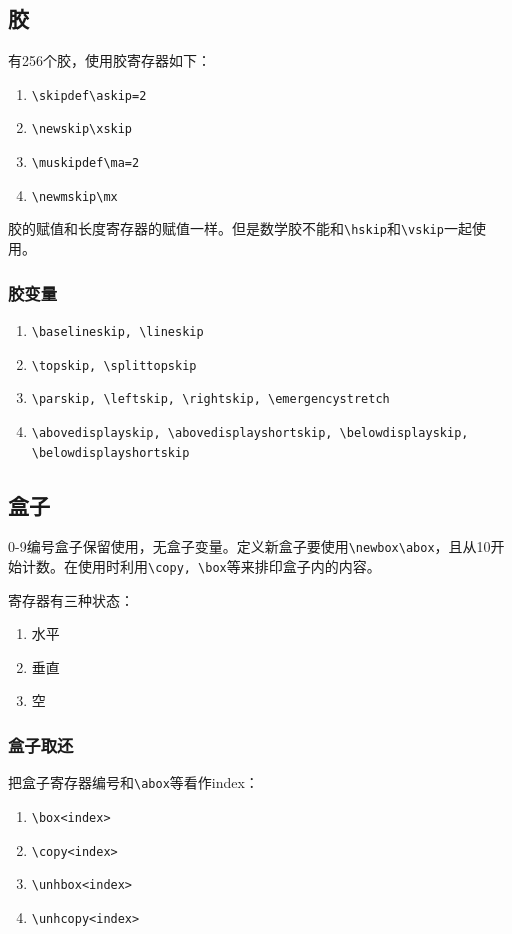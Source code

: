 \documentclass{article}
\begin{document}
\subsection{胶}
有256个胶，使用胶寄存器如下：
\begin{enumerate}
\item \verb!\skipdef\askip=2!
\item \verb!\newskip\xskip!
\item \verb!\muskipdef\ma=2!
\item \verb!\newmskip\mx!
\end{enumerate}
胶的赋值和长度寄存器的赋值一样。但是数学胶不能和\verb!\hskip!和\verb!\vskip!一起使用。

\subsubsection{胶变量}
\begin{enumerate}
\item \verb!\baselineskip, \lineskip!
\item \verb!\topskip, \splittopskip!
\item \verb!\parskip, \leftskip, \rightskip, \emergencystretch!
\item \verb!\abovedisplayskip, \abovedisplayshortskip, \belowdisplayskip, \belowdisplayshortskip!
\end{enumerate}

\subsection{盒子}
0-9编号盒子保留使用，无盒子变量。定义新盒子要使用\verb!\newbox\abox!，且从10开始计数。在使用时利用\verb!\copy, \box!等来排印盒子内的内容。

寄存器有三种状态：
\begin{enumerate}
\item 水平
\item 垂直
\item 空
\end{enumerate}
\subsubsection{盒子取还}
把盒子寄存器编号和\verb!\abox!等看作index：
\begin{enumerate}
\item \verb!\box<index>!
\item \verb!\copy<index>!
\item \verb!\unhbox<index>!
\item \verb!\unhcopy<index>!
\end{enumerate}
\end{document}

